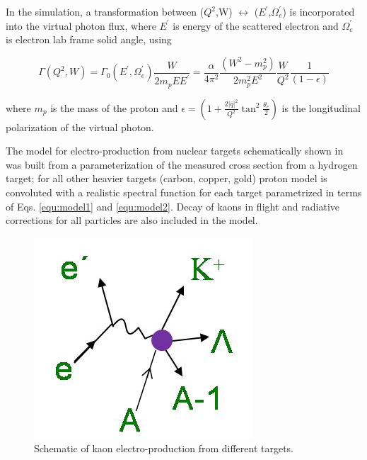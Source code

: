 In the simulation, a transformation between ($Q^2$,W) $\leftrightarrow$ ($E^\prime$,$\Omega_e^\prime$) is incorporated into the virtual photon flux, where $E^\prime$ is energy of the scattered electron and $\Omega^\prime_e$ is electron lab frame solid angle, using

\begin{equation} \label{equ:model2}
\Gamma(Q^2,W) =  \Gamma_0(E^\prime,\Omega^\prime_e) \frac{W}{2m_pEE^\prime} = \frac{\alpha}{4\pi^2}  \frac{(W^2-m^2_p)}{2m^2_pE^2} \frac{W}{Q^2} \frac{1}{(1-\epsilon)}
\end{equation}

\setlength{\figwidth}{0.4\linewidth}
\noindent
where $m_p$ is the mass of the proton and $\epsilon = \left(1 + \frac{2\left|\overline{q}\right|^2}{Q^2}\tan^2\frac{\theta_e}{2}\right)$ is the longitudinal polarization of the virtual photon.

The model for electro-production from nuclear targets schematically shown in  was built from a parameterization of the measured cross section from a hydrogen target; for all other heavier targets (carbon, copper, gold) proton model is convoluted with a realistic spectral function for each target parametrized in terms of Eqs. \ref{equ:model1} and \ref{equ:model2}. Decay of kaons in flight and radiative corrections for all particles are also included in the model. 

\begin{figure}[!tbp]
  \centering
  \includegraphics[width=0.4\columnwidth]{reaction2}
  \caption[Schematic of kaon electro-production from different targets.]{\label{fig:reaction2}Schematic of kaon electro-production from different targets.}
\end{figure}

